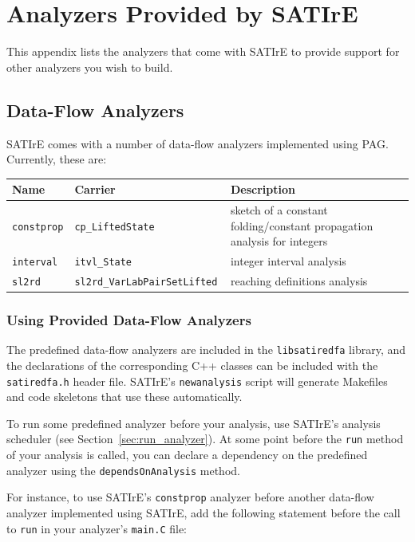 \documentclass[a4paper,12pt]{report}
\begin{document}
\chapter{Analyzers Provided by SATIrE}
\label{appendix:analyzers}

This appendix lists the analyzers that come with SATIrE to provide support
for other analyzers you wish to build.

\section{Data-Flow Analyzers}
\label{sec:analysis_dataflow}

SATIrE comes with a number of data-flow analyzers implemented using PAG.
Currently, these are:

\begin{center}
\begin{tabular}{l l p{}}
Name & Carrier & Description \\
\hline
\texttt{constprop} & \verb|cp_LiftedState| &
    sketch of a constant folding/constant propagation analysis for
    integers\\
\texttt{interval} & \verb|itvl_State| &
    integer interval analysis\\
\texttt{sl2rd} & \verb|sl2rd_VarLabPairSetLifted | &
    reaching definitions analysis
\end{tabular}
\end{center}

\subsection{Using Provided Data-Flow Analyzers}
\label{sec:analysis_dataflow_use}

The predefined data-flow analyzers are included in the \texttt{libsatiredfa}
library, and the declarations of the corresponding C++ classes can be
included with the \texttt{satiredfa.h} header file. SATIrE's
\texttt{newanalysis} script will generate Makefiles and code skeletons that
use these automatically.

To run some predefined analyzer before your analysis, use SATIrE's analysis
scheduler (see Section~\ref{sec:run_analyzer}). At some point before the
\texttt{run} method of your analysis is called, you can declare a dependency
on the predefined analyzer using the \texttt{dependsOnAnalysis} method.

For instance, to use SATIrE's \texttt{constprop} analyzer before another
data-flow analyzer implemented using SATIrE, add the following statement
before the call to \texttt{run} in your analyzer's \texttt{main.C} file:
\end{document}
